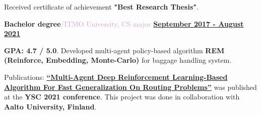 \documentclass[10pt,a4paper]{report}
\begin{document}
\vspace{2mm}

\hspace{3mm} Received certificate of achievement \textbf{"Best Research Thesis"}.

\vspace{2mm}

\textbf{\large{Bachelor degree}}\textcolor{Plum}{/ITMO University, CS major}
\hfill
\textbf{\underline{September 2017 - August 2021}}

\vspace{2mm}

\hspace{3mm} \textbf{GPA: 4.7 / 5.0}. Developed multi-agent policy-based algorithm \textbf{REM (Reinforce, Embedding, Monte-Carlo)} for baggage handling system.

\vspace{2mm}

\hspace{3mm} Publications: \textbf{\href{https://aaltodoc.aalto.fi/handle/123456789/111642}{\enquote{Multi-Agent Deep Reinforcement Learning-Based Algorithm For Fast Generalization On Routing Problems}}} was published at the \textbf{YSC 2021 conference}. This project was done in collaboration with \textbf{Aalto University, Finland}.

\vspace{2mm}
\end{document}
